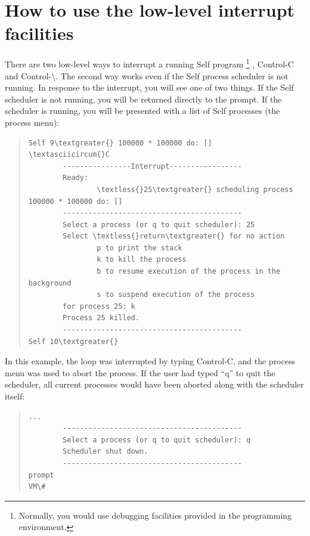 \documentclass[letterpaper,10pt,english]{sphinxmanual}
\begin{document}
\section{How to use the low-level interrupt facilities}
\label{lowlevel::doc}\label{lowlevel:how-to-use-the-low-level-interrupt-facilities}
There are two low-level ways to interrupt a running Self program \footnote{
Normally, you would use debugging facilities provided in the programming environment.
} , Control-C and Control-\textbackslash{}. The
second way works even if the Self process scheduler is not running.
In response to the interrupt, you will see one of two things. If the Self scheduler is not running,
you will be returned directly to the  prompt. If the scheduler is running, you will be presented
with a list of Self processes (the process menu):
\begin{quote}

\begin{Verbatim}[commandchars=\\\{\}]
Self 9\textgreater{} 100000 * 100000 do: []
\textasciicircum{}C
        ----------------Interrupt-----------------
        Ready:
                \textless{}25\textgreater{} scheduling process 100000 * 100000 do: []
        ------------------------------------------
        Select a process (or q to quit scheduler): 25
        Select \textless{}return\textgreater{} for no action
                p to print the stack
                k to kill the process
                b to resume execution of the process in the background
                s to suspend execution of the process
        for process 25: k
        Process 25 killed.
        ------------------------------------------
Self 10\textgreater{}
\end{Verbatim}
\end{quote}

In this example, the loop was interrupted by typing Control-C, and the process menu was used to
abort the process. If the user had typed “q” to quit the scheduler, all current processes would have
been aborted along with the scheduler itself:
\begin{quote}

\begin{Verbatim}[commandchars=\\\{\}]
        ...
        ------------------------------------------
        Select a process (or q to quit scheduler): q
        Scheduler shut down.
        ------------------------------------------
prompt
VM\#
\end{Verbatim}
\end{quote}
\end{document}
